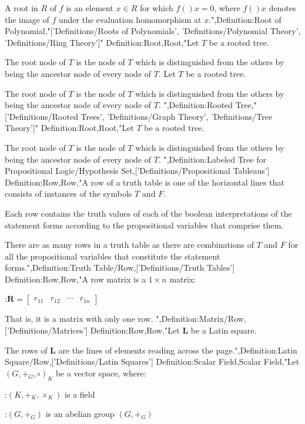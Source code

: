 A root in $R$ of $f$ is an element $x \in R$ for which $f \left(   \right)x = 0$, where $f \left(   \right)x$ denotes the image of $f$ under the evaluation homomorphism at $x$.",Definition:Root of Polynomial,"['Definitions/Roots of Polynomials', 'Definitions/Polynomial Theory', 'Definitions/Ring Theory']"
Definition:Root,Root,"Let $T$ be a rooted tree.

The root node of $T$ is the node of $T$ which is distinguished from the others by being the ancestor node of every node of $T$.
Let $T$ be a rooted tree.

The root node of $T$ is the node of $T$ which is distinguished from the others by being the ancestor node of every node of $T$.
",Definition:Rooted Tree,"['Definitions/Rooted Trees', 'Definitions/Graph Theory', 'Definitions/Tree Theory']"
Definition:Root,Root,"Let $T$ be a rooted tree.

The root node of $T$ is the node of $T$ which is distinguished from the others by being the ancestor node of every node of $T$.
",Definition:Labeled Tree for Propositional Logic/Hypothesis Set,['Definitions/Propositional Tableaus']
Definition:Row,Row,"A row of a truth table is one of the horizontal lines that consists of instances of the symbols $T$ and $F$.

Each row contains the truth values of each of the boolean interpretations of the statement forms according to the propositional variables that comprise them.

There are as many rows in a truth table as there are combinations of $T$ and $F$ for all the propositional variables that constitute the statement forms.",Definition:Truth Table/Row,['Definitions/Truth Tables']
Definition:Row,Row,"A row matrix is a $1 \times n$ matrix:

:$\mathbf R = \begin{bmatrix}
r_{1 1} & r_{1 2} & \cdots & r_{1 n}
\end{bmatrix}$


That is, it is a matrix with only one row.
",Definition:Matrix/Row,['Definitions/Matrices']
Definition:Row,Row,"Let $\mathbf L$ be a Latin square.

The rows of $\mathbf L$ are the lines of elements reading across the page.",Definition:Latin Square/Row,['Definitions/Latin Squares']
Definition:Scalar Field,Scalar Field,"Let $\left( G, +_G, \circ \right)_K$ be a vector space, where:

:$\left( K, +_K, \times_K \right)$ is a field

:$\left( G, +_G \right)$ is an abelian group $\left( G, +_G \right)$

